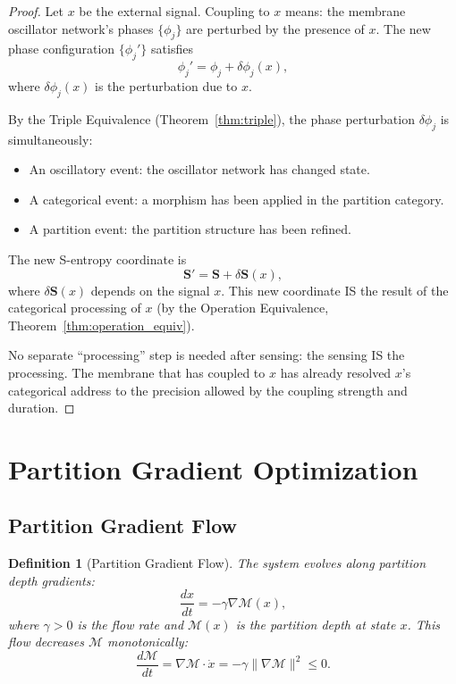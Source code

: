 \documentclass[twocolumn,10pt]{article}
\newtheorem{definition}[theorem]{Definition}
\theoremstyle{remark}
\newcommand{\Depth}{\mathcal{M}}
\newcommand{\Scoord}{\mathbf{S}}
\begin{document}
\begin{proof}
Let $x$ be the external signal. Coupling to $x$ means: the membrane oscillator network's phases $\{\phi_j\}$ are perturbed by the presence of $x$. The new phase configuration $\{\phi_j'\}$ satisfies
\begin{equation}
\phi_j' = \phi_j + \delta\phi_j(x),
\end{equation}
where $\delta\phi_j(x)$ is the perturbation due to $x$.

By the Triple Equivalence (Theorem~\ref{thm:triple}), the phase perturbation $\delta\phi_j$ is simultaneously:
\begin{itemize}
\item An oscillatory event: the oscillator network has changed state.
\item A categorical event: a morphism has been applied in the partition category.
\item A partition event: the partition structure has been refined.
\end{itemize}

The new S-entropy coordinate is
\begin{equation}
\Scoord' = \Scoord + \delta\Scoord(x),
\end{equation}
where $\delta\Scoord(x)$ depends on the signal $x$. This new coordinate IS the result of the categorical processing of $x$ (by the Operation Equivalence, Theorem~\ref{thm:operation_equiv}).

No separate ``processing'' step is needed after sensing: the sensing IS the processing. The membrane that has coupled to $x$ has already resolved $x$'s categorical address to the precision allowed by the coupling strength and duration.
\end{proof}

\section{Partition Gradient Optimization}
\label{sec:optimization}

\subsection{Partition Gradient Flow}

\begin{definition}[Partition Gradient Flow]
\label{def:gradient_flow}
The system evolves along partition depth gradients:
\begin{equation}
\frac{dx}{dt} = -\gamma \nabla \Depth(x),
\label{eq:gradient_flow}
\end{equation}
where $\gamma > 0$ is the flow rate and $\Depth(x)$ is the partition depth at state $x$. This flow decreases $\Depth$ monotonically:
\begin{equation}
\frac{d\Depth}{dt} = \nabla\Depth \cdot \dot{x} = -\gamma \|\nabla\Depth\|^2 \leq 0.
\end{equation}
\end{definition}
\end{document}
